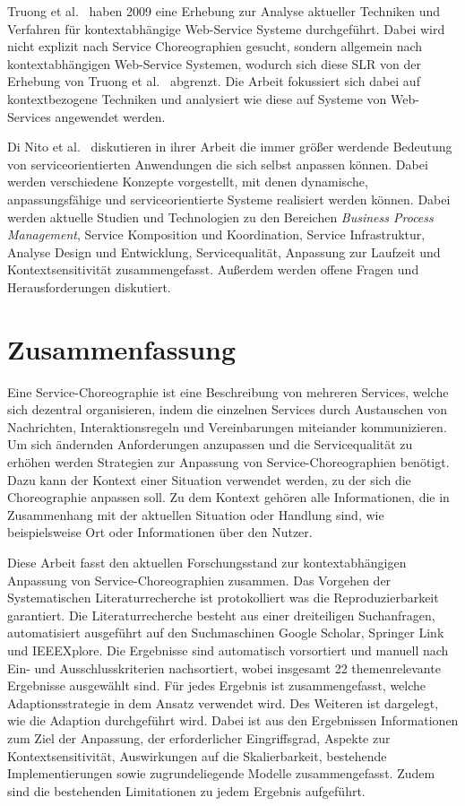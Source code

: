 \documentclass[conference,compsoc,ngerman]{IEEEtran}
\begin{document}
Truong et al.~\cite{truong2009survey} haben 2009 eine Erhebung zur Analyse aktueller Techniken und Verfahren für kontextabhängige Web-Service Systeme durchgeführt. Dabei wird nicht explizit nach Service Choreographien gesucht, sondern allgemein nach kontextabhängigen Web-Service Systemen, wodurch sich diese SLR von der Erhebung von Truong et al.~\cite{truong2009survey} abgrenzt. Die Arbeit fokussiert sich dabei auf kontextbezogene Techniken und analysiert wie diese auf Systeme von Web-Services angewendet werden.

Di Nito et al.~\cite{di2008journey} diskutieren in ihrer Arbeit die immer größer werdende Bedeutung von serviceorientierten Anwendungen die sich selbst anpassen können. Dabei werden verschiedene Konzepte vorgestellt, mit denen dynamische, anpassungsfähige und serviceorientierte Systeme realisiert werden können. Dabei werden aktuelle Studien und Technologien zu den Bereichen \textit{Business Process Management}, Service Komposition und Koordination, Service Infrastruktur, Analyse Design und Entwicklung, Servicequalität, Anpassung zur Laufzeit und Kontextsensitivität zusammengefasst. Außerdem werden offene Fragen und Herausforderungen diskutiert.

\section{Zusammenfassung}\label{s:zusammenfassung}
Eine Service-Choreographie ist eine Beschreibung von mehreren Services, welche sich dezentral organisieren, indem die einzelnen Services durch Austauschen von Nachrichten, Interaktionsregeln und Vereinbarungen miteiander kommunizieren. Um sich ändernden Anforderungen anzupassen und die Servicequalität zu erhöhen werden Strategien zur Anpassung von Service-Choreographien benötigt. Dazu kann der Kontext einer Situation verwendet werden, zu der sich die Choreographie anpassen soll. Zu dem Kontext gehören alle Informationen, die in Zusammenhang mit der aktuellen Situation oder Handlung sind, wie beispielsweise Ort oder Informationen über den Nutzer.

Diese Arbeit fasst den aktuellen Forschungsstand zur kontextabhängigen Anpassung von Service-Choreographien zusammen. Das Vorgehen der Systematischen Literaturrecherche ist protokolliert was die Reproduzierbarkeit garantiert. Die Literaturrecherche besteht aus einer dreiteiligen Suchanfragen, automatisiert ausgeführt auf den Suchmaschinen Google Scholar, Springer Link und IEEEXplore. Die Ergebnisse sind automatisch vorsortiert und manuell nach Ein- und Ausschlusskriterien nachsortiert, wobei insgesamt 22
themenrelevante Ergebnisse ausgewählt sind. Für jedes Ergebnis ist zusammengefasst, welche Adaptionsstrategie in dem Ansatz verwendet wird. Des Weiteren ist dargelegt, wie die Adaption durchgeführt wird. Dabei ist aus den Ergebnissen Informationen zum Ziel der Anpassung, der erforderlicher Eingriffsgrad, Aspekte zur Kontextsensitivität, Auswirkungen auf die Skalierbarkeit, bestehende Implementierungen sowie zugrundeliegende Modelle zusammengefasst. Zudem sind die bestehenden Limitationen zu jedem Ergebnis aufgeführt.
\end{document}
